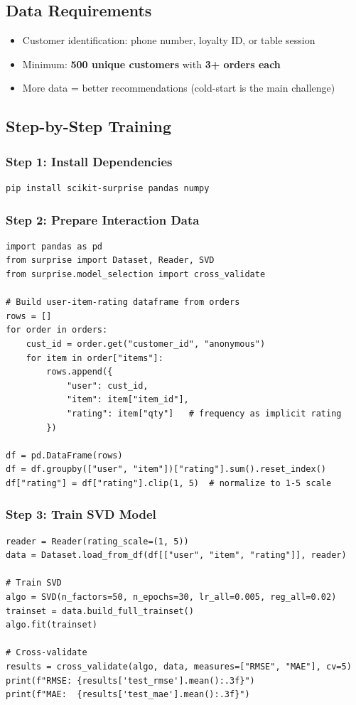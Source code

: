 \documentclass[12pt, a4paper]{article}
\begin{document}
\subsection{Data Requirements}
\begin{itemize}[nosep]
    \item Customer identification: phone number, loyalty ID, or table session
    \item Minimum: \textbf{500 unique customers} with \textbf{3+ orders each}
    \item More data = better recommendations (cold-start is the main challenge)
\end{itemize}


\subsection{Step-by-Step Training}

\subsubsection{Step 1: Install Dependencies}
\begin{lstlisting}[language=bash]
pip install scikit-surprise pandas numpy
\end{lstlisting}

\subsubsection{Step 2: Prepare Interaction Data}
\begin{lstlisting}
import pandas as pd
from surprise import Dataset, Reader, SVD
from surprise.model_selection import cross_validate

# Build user-item-rating dataframe from orders
rows = []
for order in orders:
    cust_id = order.get("customer_id", "anonymous")
    for item in order["items"]:
        rows.append({
            "user": cust_id,
            "item": item["item_id"],
            "rating": item["qty"]   # frequency as implicit rating
        })

df = pd.DataFrame(rows)
df = df.groupby(["user", "item"])["rating"].sum().reset_index()
df["rating"] = df["rating"].clip(1, 5)  # normalize to 1-5 scale
\end{lstlisting}

\subsubsection{Step 3: Train SVD Model}
\begin{lstlisting}
reader = Reader(rating_scale=(1, 5))
data = Dataset.load_from_df(df[["user", "item", "rating"]], reader)

# Train SVD
algo = SVD(n_factors=50, n_epochs=30, lr_all=0.005, reg_all=0.02)
trainset = data.build_full_trainset()
algo.fit(trainset)

# Cross-validate
results = cross_validate(algo, data, measures=["RMSE", "MAE"], cv=5)
print(f"RMSE: {results['test_rmse'].mean():.3f}")
print(f"MAE:  {results['test_mae'].mean():.3f}")
\end{lstlisting}
\end{document}
